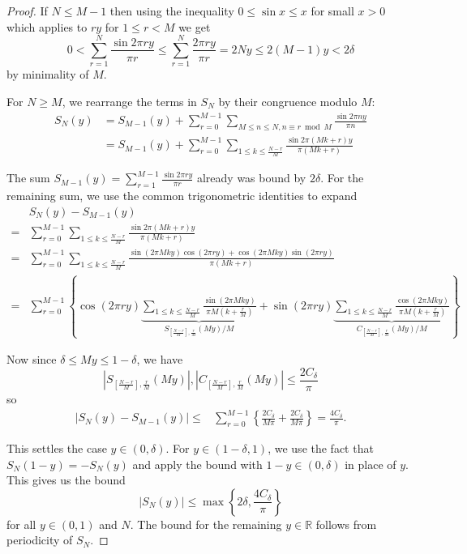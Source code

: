 \documentclass[12pt]{article}
\newcommand{\R}{\mathbb{R}}
\newcommand{\Abs}[1]{\left| #1 \right|}
\begin{document}
\begin{proof}
If $N \leq M - 1$ then using the inequality $0 \leq \sin x \leq x$ for small $x > 0$ which applies to $ry$ for $1 \leq r < M$ we get
$$0 < \sum_{r = 1}^{N} \frac{\sin 2\pi r y}{\pi r} \leq \sum_{r = 1}^{N} \frac{2\pi r y}{\pi r} = 2 N y \leq 2 (M - 1) y < 2 \delta$$
by minimality of $M$.

For $N \geq M$, we rearrange the terms in $S_N$ by their congruence modulo $M$:
\begin{align*}
S_N(y) &= S_{M-1}(y) + \sum_{r = 0}^{M - 1} \sum_{M \leq n \leq N, n \equiv r \bmod M} \frac{\sin 2\pi n y}{\pi n}\\
&= S_{M-1}(y) + \sum_{r = 0}^{M - 1} \sum_{1 \leq k \leq \frac{N-r}{M}} \frac{\sin 2\pi (M k + r) y}{\pi (M k + r)}
\end{align*}

The sum $S_{M - 1}(y) = \sum_{r = 1}^{M - 1} \frac{\sin 2\pi r y}{\pi r}$ already was bound by $2\delta$. For the remaining sum, we use the common trigonometric identities to expand
\begin{align*}
&S_N(y) - S_{M-1}(y)\\
=& \sum_{r = 0}^{M - 1} \sum_{1 \leq k \leq \frac{N-r}{M}} \frac{\sin 2\pi (M k + r) y}{\pi (M k + r)} \\
=& \sum_{r = 0}^{M - 1} \sum_{1 \leq k \leq \frac{N-r}{M}} \frac{\sin (2 \pi M k y) \cos (2\pi r y) + \cos (2 \pi M k y) \sin (2 \pi r y)}{\pi (M k + r)} \\
=& \sum_{r = 0}^{M - 1} \left\{ \cos (2\pi r y) \underbrace{\sum_{1 \leq k \leq \frac{N-r}{M}} \frac{\sin (2 \pi M k y)}{\pi M (k + \frac{r}{M})}}_{S_{[\frac{N-r}{M}], \frac{r}{M}}(My) / M} + \sin (2 \pi r y) \underbrace{\sum_{1 \leq k \leq \frac{N-r}{M}} \frac{\cos (2 \pi M k y)}{\pi M (k + \frac{r}{M})}}_{C_{[\frac{N-r}{M}], \frac{r}{M}}(My) / M} \right\}
\end{align*}

Now since $\delta \leq My \leq 1 - \delta$, we have 
$$\Abs{ S_{[\frac{N-r}{M}], \frac{r}{M}}(My) }, \Abs{ C_{[\frac{N-r}{M}], \frac{r}{M}}(My) } \leq \frac{2 C_\delta}{\pi}$$
so
\begin{align*}
\Abs{S_N(y) - S_{M - 1}(y)} 
\leq& \sum_{r = 0}^{M - 1} \left\{ \frac{2 C_\delta}{M \pi} + \frac{2C_\delta}{M \pi} \right\} = \frac{4C_\delta}{\pi}.
\end{align*}

This settles the case $y \in (0, \delta)$. For $y \in (1-\delta, 1)$, we use the fact that $S_N(1 - y) = -S_N(y)$ and apply the bound with $1 - y \in (0, \delta)$ in place of $y$. This gives us the bound
$$|S_N(y)| \leq \max\left\{2\delta, \frac{4C_\delta}{\pi}\right\}$$
for all $y \in (0, 1)$ and $N$. The bound for the remaining $y \in \R$ follows from periodicity of $S_N$.
\end{proof}

\unless\ifdefined\IsMainDocument
\end{document}
